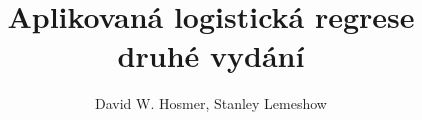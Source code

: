 \documentclass[a4paper]{book}
\begin{document}
\newtheorem{definition}{Definice}[chapter]
\newtheorem{theorem}{Věta}[chapter]
\newtheorem{proof}{Důkaz}[chapter]
\newtheorem{example}{Příklad}[chapter]
\newtheorem{corollary}{Tvrzení}[chapter]
\newtheorem{assumption}{Předpoklad}[chapter]


\title{Aplikovaná logistická regrese\\druhé vydání}
\author{David W. Hosmer, Stanley Lemeshow}
\maketitle

\tableofcontents




\end{document}
